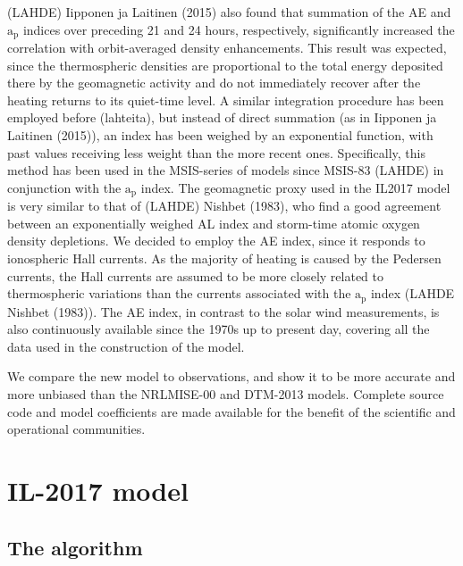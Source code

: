 \documentclass[referee,a4paper,12pt,traditabstract]{swsc}
\begin{document}
\begin{linenumbers}
(LAHDE) Iipponen ja Laitinen (2015) also found that summation of the AE and $\mathrm{a_{p}}$ indices over preceding 21 and 24 hours, respectively, significantly increased the correlation with orbit-averaged density enhancements. This result was expected, since the thermospheric densities are proportional to the total energy deposited there by the geomagnetic activity and do not immediately recover after the heating returns to its quiet-time level. A similar integration procedure has been employed before (lahteita), but instead of direct summation (as in Iipponen ja Laitinen (2015)), an index has been weighed by an exponential function, with past values receiving less weight than the more recent ones. Specifically, this method has been used in the MSIS-series of models since MSIS-83 (LAHDE) in conjunction with the $\mathrm{a_{p}}$ index. The geomagnetic proxy used in the IL2017 model is very similar to that of (LAHDE) Nishbet (1983), who find a good agreement between an exponentially weighed AL index and storm-time atomic oxygen density depletions. We decided to employ the AE index, since it responds to ionospheric Hall currents. As the majority of heating is caused by the Pedersen currents, the Hall currents are assumed to be more closely related to thermospheric variations than the currents associated with the $\mathrm{a_{p}}$ index (LAHDE Nishbet (1983)). The AE index, in contrast to the solar wind measurements, is also continuously available since the 1970s up to present day, covering all the data used in the construction of the model. 

We compare the new model to observations, and show it to be more accurate and more unbiased than the NRLMISE-00 and DTM-2013 models. Complete source code and model coefficients are made available for the benefit of the scientific and operational communities.



\section{IL-2017 model}

\subsection{The algorithm}


\end{linenumbers}
\end{document}
